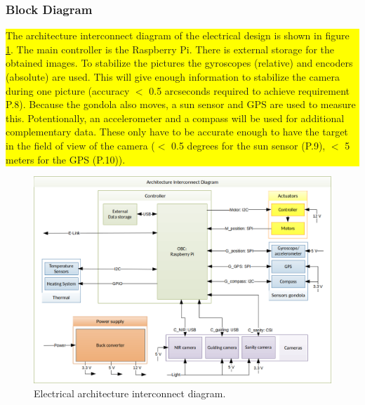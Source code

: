 \subsubsection{Block Diagram}
\label{sec:4.5.1}
\colorbox{yellow}{\parbox{\textwidth}{The architecture interconnect diagram of the electrical design is shown in figure \ref{fig:elec-AID}. The main controller is the Raspberry Pi. There is external storage for the obtained images. To stabilize the pictures the gyroscopes (relative) and encoders (absolute) are used. This will give enough information to stabilize the camera during one picture (accuracy $<$ 0.5 arcseconds required to achieve requirement P.8). Because the gondola also moves, a sun sensor and GPS are used to measure this. Potentionally, an accelerometer and a compass will be used for additional complementary data. These only have to be accurate enough to have the target in the field of view of the camera ($<$ 0.5 degrees for the sun sensor (P.9), $<$ 5 meters for the GPS (P.10)).}}
\vspace{-.5cm}
\begin{figure}[H]
	\centering
	\includegraphics[width=.85\textwidth]{4-experiment-design/img/electrical/ArchitectureInterconnect.png}
	\caption{Electrical architecture interconnect diagram.}
	\label{fig:elec-AID}
\end{figure}

